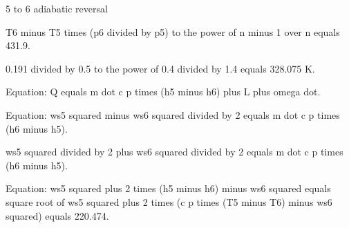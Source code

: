5 to 6 adiabatic reversal

T6 minus T5 times (p6 divided by p5) to the power of n minus 1 over n equals 431.9.

0.191 divided by 0.5 to the power of 0.4 divided by 1.4 equals 328.075 K.

Equation: Q equals m dot c p times (h5 minus h6) plus L plus omega dot.

Equation: ws5 squared minus ws6 squared divided by 2 equals m dot c p times (h6 minus h5).

ws5 squared divided by 2 plus ws6 squared divided by 2 equals m dot c p times (h6 minus h5).

Equation: ws5 squared plus 2 times (h5 minus h6) minus ws6 squared equals square root of ws5 squared plus 2 times (c p times (T5 minus T6) minus ws6 squared) equals 220.474.